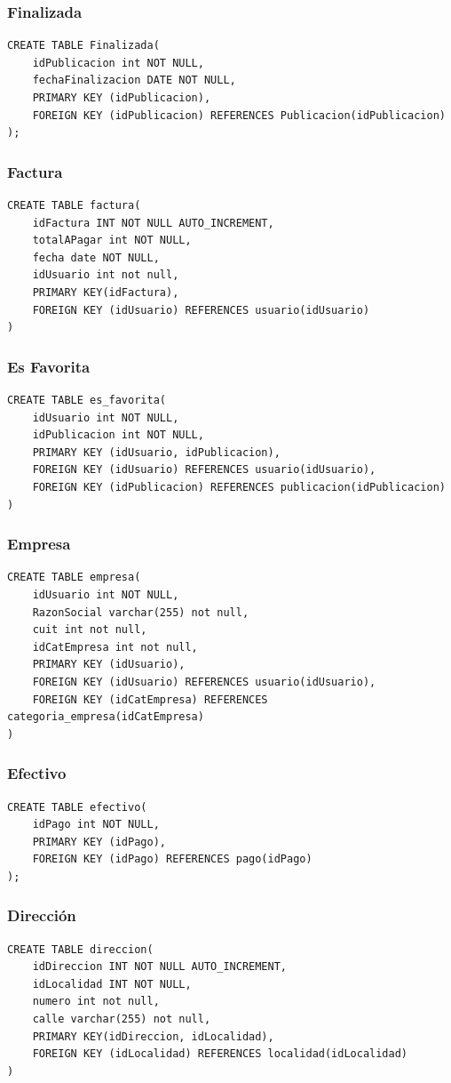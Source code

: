 \documentclass[a4paper, 10pt, twoside]{article}
\begin{document}
\subsubsection{Finalizada}
\begin{verbatim}
CREATE TABLE Finalizada(
	idPublicacion int NOT NULL,
	fechaFinalizacion DATE NOT NULL,
	PRIMARY KEY (idPublicacion),
    FOREIGN KEY (idPublicacion) REFERENCES Publicacion(idPublicacion)
);
\end{verbatim}
\subsubsection{Factura}
\begin{verbatim}
CREATE TABLE factura(
	idFactura INT NOT NULL AUTO_INCREMENT,
	totalAPagar int NOT NULL,
    fecha date NOT NULL,
    idUsuario int not null,
    PRIMARY KEY(idFactura),
    FOREIGN KEY (idUsuario) REFERENCES usuario(idUsuario)
)
\end{verbatim}
\subsubsection{Es Favorita}
\begin{verbatim}
CREATE TABLE es_favorita(
	idUsuario int NOT NULL,
    idPublicacion int NOT NULL,
    PRIMARY KEY (idUsuario, idPublicacion),
    FOREIGN KEY (idUsuario) REFERENCES usuario(idUsuario),
    FOREIGN KEY (idPublicacion) REFERENCES publicacion(idPublicacion)
)
\end{verbatim}
\subsubsection{Empresa}
\begin{verbatim}
CREATE TABLE empresa(
	idUsuario int NOT NULL,
    RazonSocial varchar(255) not null,
    cuit int not null,
	idCatEmpresa int not null,
    PRIMARY KEY (idUsuario),
    FOREIGN KEY (idUsuario) REFERENCES usuario(idUsuario),
    FOREIGN KEY (idCatEmpresa) REFERENCES categoria_empresa(idCatEmpresa)
)
\end{verbatim}
\subsubsection{Efectivo}
\begin{verbatim}
CREATE TABLE efectivo(
	idPago int NOT NULL,
	PRIMARY KEY (idPago),
    FOREIGN KEY (idPago) REFERENCES pago(idPago)
);
\end{verbatim}
\newpage
\subsubsection{Direcci\'on}
\begin{verbatim}
CREATE TABLE direccion(
	idDireccion INT NOT NULL AUTO_INCREMENT,
	idLocalidad INT NOT NULL,
    numero int not null,
    calle varchar(255) not null,
    PRIMARY KEY(idDireccion, idLocalidad),
    FOREIGN KEY (idLocalidad) REFERENCES localidad(idLocalidad)
)
\end{verbatim}
\end{document}
